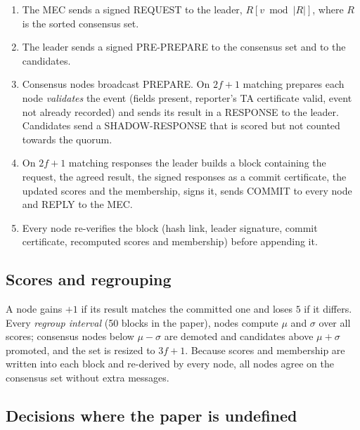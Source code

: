 \begin{enumerate}
\item The MEC sends a signed REQUEST to the leader, $R[v \bmod |R|]$, where
$R$ is the sorted consensus set.
\item The leader sends a signed PRE-PREPARE to the consensus set and to the
candidates.
\item Consensus nodes broadcast PREPARE. On $2f+1$ matching prepares each node
\emph{validates} the event (fields present, reporter's TA certificate valid,
event not already recorded) and sends its result in a RESPONSE to the leader.
Candidates send a SHADOW-RESPONSE that is scored but not counted towards the
quorum.
\item On $2f+1$ matching responses the leader builds a block containing the
request, the agreed result, the signed responses as a commit certificate, the
updated scores and the membership, signs it, sends COMMIT to every node and
REPLY to the MEC.
\item Every node re-verifies the block (hash link, leader signature, commit
certificate, recomputed scores and membership) before appending it.
\end{enumerate}

\subsection{Scores and regrouping}

A node gains $+1$ if its result matches the committed one and loses $5$ if it
differs. Every \emph{regroup interval} (50 blocks in the paper), nodes compute
$\mu$ and $\sigma$ over all scores; consensus nodes below $\mu - \sigma$ are
demoted and candidates above $\mu + \sigma$ promoted, and the set is resized
to $3f+1$. Because scores and membership are written into each block and
re-derived by every node, all nodes agree on the consensus set without extra
messages.

\subsection{Decisions where the paper is undefined}

